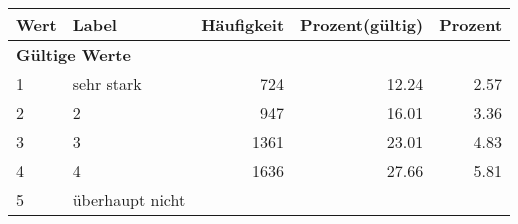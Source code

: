      \begin{longtable}{lXrrr}
     \toprule
     \textbf{Wert} & \textbf{Label} & \textbf{Häufigkeit} & \textbf{Prozent(gültig)} & \textbf{Prozent} \\
     \endhead
     \midrule
     \multicolumn{5}{l}{\textbf{Gültige Werte}}\\

     1 &
     \multicolumn{1}{X}{ sehr stark   } &


       \num{724} &
       \num[round-mode=places,round-precision=2]{12.24} &
         \num[round-mode=places,round-precision=2]{2.57} \\

     2 &
     \multicolumn{1}{X}{ 2   } &


       \num{947} &
       \num[round-mode=places,round-precision=2]{16.01} &
         \num[round-mode=places,round-precision=2]{3.36} \\

     3 &
     \multicolumn{1}{X}{ 3   } &


       \num{1361} &
       \num[round-mode=places,round-precision=2]{23.01} &
         \num[round-mode=places,round-precision=2]{4.83} \\

     4 &
     \multicolumn{1}{X}{ 4   } &


       \num{1636} &
       \num[round-mode=places,round-precision=2]{27.66} &
         \num[round-mode=places,round-precision=2]{5.81} \\

     5 &
     \multicolumn{1}{X}{ überhaupt nicht   } &



\end{longtable}
